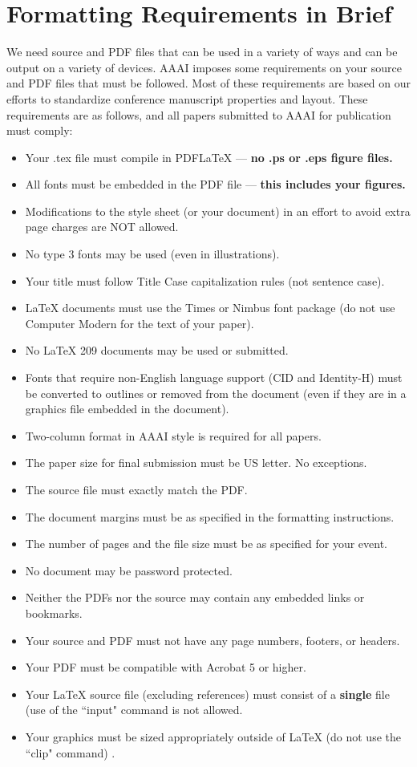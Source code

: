 \documentclass[letterpaper]{article}
\begin{document}
\section{Formatting Requirements in Brief}
We need source and PDF files that can be used in a variety of ways and can be output on a variety of devices. AAAI imposes some requirements on your source and PDF files that must be followed. Most of these requirements are based on our efforts to standardize conference manuscript properties and layout. These requirements are as follows, and all papers submitted to AAAI for publication must comply:

\begin{itemize}
\item Your .tex file must compile in PDF\LaTeX{} --- \textbf{ no .ps or .eps figure files.}
\item All fonts must be embedded in the PDF file --- \textbf{ this includes your figures.}
\item Modifications to the style sheet (or your document) in an effort to avoid extra page charges are NOT allowed.
\item No type 3 fonts may be used (even in illustrations).
\item Your title must follow Title Case capitalization rules (not sentence case).
\item \LaTeX{} documents must use the Times or Nimbus font package (do not use Computer Modern for the text of your paper).
\item No \LaTeX{} 209 documents may be used or submitted.
\item Fonts that require non-English language support (CID and Identity-H) must be converted to outlines or removed from the document (even if they are in a graphics file embedded in the document). 
\item Two-column format in AAAI style is required for all papers.
\item The paper size for final submission must be US letter. No exceptions.
\item The source file must exactly match the PDF.
\item The document margins must be as specified in the formatting instructions.
\item The number of pages and the file size must be as specified for your event.
\item No document may be password protected.
\item Neither the PDFs nor the source may contain any embedded links or bookmarks.
\item Your source and PDF must not have any page numbers, footers, or headers.
\item Your PDF must be compatible with Acrobat 5 or higher.
\item Your \LaTeX{} source file (excluding references) must consist of a \textbf{single} file (use of the ``input" command is not allowed.
\item Your graphics must be sized appropriately outside of \LaTeX{} (do not use the ``clip" command) .
\end{itemize}
\end{document}
